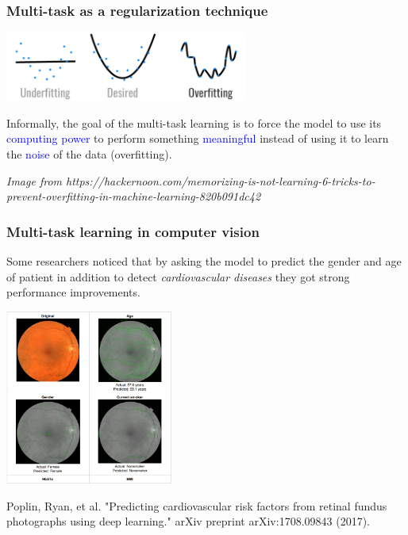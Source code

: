 \documentclass[10pt]{beamer}
\begin{document}
\begin{frame}
  \frametitle{Multi-task as a regularization technique}

  \begin{center}
    \includegraphics[width = 8cm]{images/overfitting.png}
  \end{center}

  Informally, the goal of the multi-task learning is to force the
  model to use its \textcolor{blue}{computing power} to perform
  something \textcolor{blue}{meaningful} instead of using it to learn
  the \textcolor{blue}{noise} of the data (overfitting).

  \bigskip

  {\scriptsize \textit{Image from
      https://hackernoon.com/memorizing-is-not-learning-6-tricks-to-prevent-overfitting-in-machine-learning-820b091dc42}}
\end{frame}

\begin{frame}
  \frametitle{Multi-task learning in computer vision}

  Some researchers noticed that by asking the model to predict the
  gender and age of patient in addition to detect \emph{cardiovascular
    diseases} they got strong performance improvements.

  \medskip

  \begin{center}
    \includegraphics[width = 5.5cm]{images/multi_task_medecine.png}
  \end{center}

  {\scriptsize Poplin, Ryan, et al. "Predicting cardiovascular risk
    factors from retinal fundus photographs using deep learning."
    arXiv preprint arXiv:1708.09843 (2017).}
\end{frame}
\end{document}
